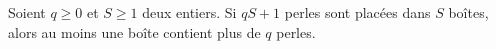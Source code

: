 Soient $q \geq 0$ et $S \geq 1$ deux entiers. Si $qS + 1$ perles sont placées dans $S$ boîtes, alors au moins une boîte
contient plus de $q$ perles.
